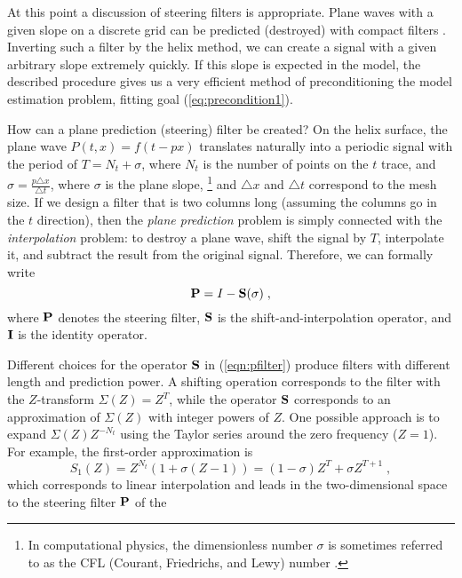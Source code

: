 At this point a discussion of steering filters is appropriate.
Plane waves with a given slope on a discrete grid can be predicted
(destroyed) with compact filters \cite{Schwab.sep.94.matt2}. Inverting
such a filter by the helix method, we can create a signal with a given
arbitrary slope extremely quickly. If this slope is expected in the
model, the described procedure gives us a very efficient method of
preconditioning the model estimation problem, fitting goal (\ref{eq:precondition1}).
\par
How can a plane prediction (steering) filter be created? On the helix surface,
the plane wave $P(t,x) = f (t - p x)$ translates naturally into a
periodic signal with the period of $T = N_t + \sigma$, where $N_t$ is
the number of points on the $t$ trace, and $\sigma = \frac{p \triangle
  x}{\triangle t}$, where $\sigma$ is the plane slope, 
\footnote{In
  computational physics, the dimensionless number $\sigma$ is
  sometimes referred to as the CFL (Courant, Friedrichs, and Lewy)
  number \cite{sod}.} 
and $\triangle
x$ and $\triangle t$ correspond to the mesh size.
If we design a filter that is two columns long
(assuming the columns go in the $t$ direction), then the \emph{plane
  prediction} problem is simply connected with the
\emph{interpolation} problem: to destroy a plane wave, shift the
signal by $T$, interpolate it, and subtract the result from the
original signal. Therefore, we can formally write
\begin{equation}
  \label{eqn:pfilter}
  \bold{P} = I - \bold{S}(\sigma)\;,
\end{equation}
where $\bold{P}$ denotes the steering filter, $\bold{S}$ is
the shift-and-interpolation operator, and $\bold{I}$ is the identity
operator.
\par
Different choices for the operator $\bold{S}$ in (\ref{eqn:pfilter})
produce filters with different length and prediction power.
A shifting operation corresponds to the filter with the $Z$-transform
$\Sigma(Z) = Z^T$, while the operator $\bold{S}$ corresponds to an
approximation of $\Sigma(Z)$ with integer powers of $Z$. One possible
approach is to expand $\Sigma(Z) Z^{-N_t}$ using the Taylor series around
the zero frequency ($Z=1$). For example, the first-order approximation
is
\begin{equation}
  \label{eqn:plinear}
  S_1(Z) = Z^{N_t} \left(1 + \sigma (Z-1)\right) = (1-\sigma) Z^T +
  \sigma Z^{T+1}\;,
\end{equation}
which corresponds to linear interpolation and leads in the
two-dimensional space to the steering filter $\bold{P}$ of the
